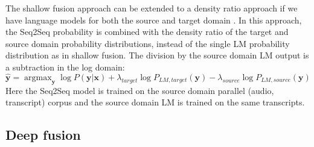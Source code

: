 \documentclass[11pt]{article}
\DeclareMathOperator*{\argmax}{argmax}
\begin{document}
The shallow fusion approach can be extended to a density ratio approach if we have language models for both the source and target domain \citep{Mcdermott}. In this approach, the Seq2Seq probability is combined with the density ratio of the target and source domain probability distributions, instead of the single LM probability distribution as in shallow fusion. The division by the source domain LM output is a subtraction in the log domain:
\begin{equation}
    \hat{\boldsymbol{y}} = \argmax_{\boldsymbol{y}} \log P(\boldsymbol{y}|\boldsymbol{x}) + \lambda_{target} \log P_{LM,target}(\boldsymbol{y}) - \lambda_{source} \log P_{LM,source}(\boldsymbol{y}) \label{shallowfusion}
\end{equation}
Here the Seq2Seq model is trained on the source domain parallel (audio, transcript) corpus and the source domain LM is trained on the same transcripts.




\subsection{Deep fusion}
\end{document}
